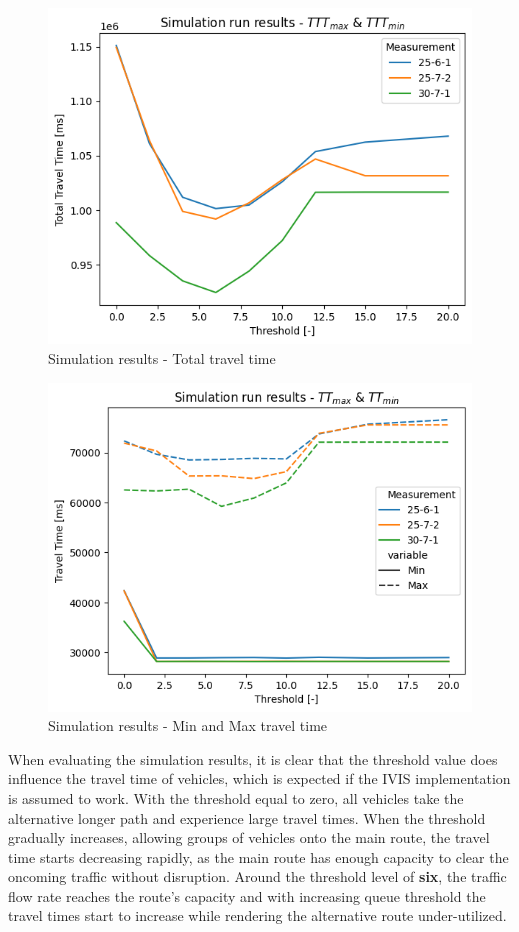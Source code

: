 \documentclass[main.tex]{subfiles}
\begin{document}
\begin{figure}[htbp]
    \centering
    \includegraphics[width=.8\textwidth]{ttt.png}
    \caption{Simulation results - Total travel time}
    \label{fig-sim-ttt}
\end{figure}

\begin{figure}[htbp]
    \centering
    \includegraphics[width=.8\textwidth]{MinMax.png}
    \caption{Simulation results - Min and Max travel time}
    \label{fig-sim-minmax}
\end{figure}

When evaluating the simulation results, it is clear that the threshold value does influence the
travel time of vehicles, which is expected if the IVIS implementation is assumed to work. With
the threshold equal to zero, all vehicles take the alternative longer path and experience large
travel times. When the threshold gradually increases, allowing groups of vehicles onto the 
main route, the travel time starts decreasing rapidly, as the main route has enough capacity to clear 
the oncoming traffic without disruption. Around the threshold level of \textbf{six}, the traffic flow 
rate reaches the route's capacity and with increasing queue threshold the travel times start to
increase while rendering the alternative route under-utilized.
\end{document}
